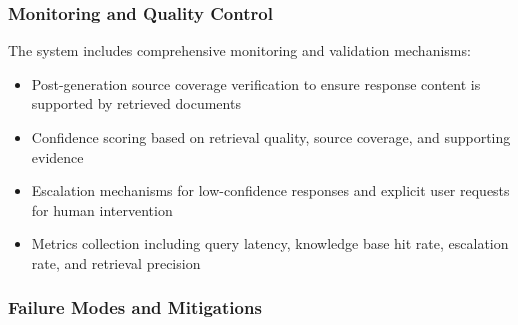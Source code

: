 \subsubsection{Monitoring and Quality Control}

The system includes comprehensive monitoring and validation mechanisms:

\begin{itemize}\setlength{\itemsep}{0pt}
    \item Post-generation source coverage verification to ensure response content is supported by retrieved documents
    \item Confidence scoring based on retrieval quality, source coverage, and supporting evidence
    \item Escalation mechanisms for low-confidence responses and explicit user requests for human intervention
    \item Metrics collection including query latency, knowledge base hit rate, escalation rate, and retrieval precision
\end{itemize}




\subsubsection{Failure Modes and Mitigations}

